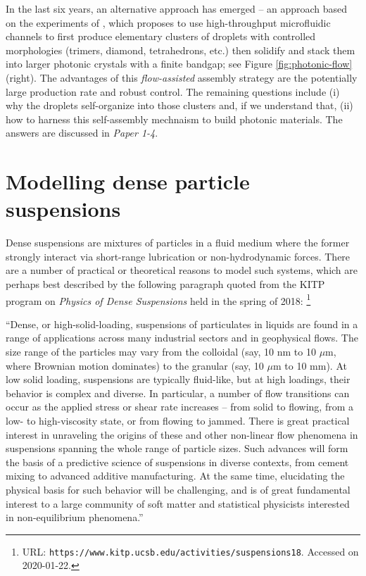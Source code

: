 In the last six years, an alternative approach has emerged -- an approach based on the experiments of \cite{tab0, Shen_AS_2016}, which proposes to use high-throughput microfluidic channels to first produce elementary clusters of droplets with controlled morphologies (trimers, diamond, tetrahedrons, etc.) then solidify and stack them into larger photonic crystals with a finite bandgap; see Figure \ref{fig:photonic-flow} (right).
The advantages of this \emph{flow-assisted} assembly strategy are the potentially large production rate and robust control.
The remaining questions include
(i) why the droplets self-organize into those clusters and, if we understand that,
(ii) how to harness this self-assembly mechnaism to build photonic materials.
The answers are discussed in \emph{Paper 1-4}.


\section{Modelling dense particle suspensions}

Dense suspensions are mixtures of particles in a fluid medium where the former strongly interact via short-range lubrication or non-hydrodynamic forces.
There are a number of practical or theoretical reasons to model such systems, which are perhaps best described by the following paragraph quoted from the KITP program on \emph{Physics of Dense Suspensions} held in the spring of 2018:
\footnote{URL: \texttt{https://www.kitp.ucsb.edu/activities/suspensions18}. Accessed on 2020-01-22.}

\medskip
{\small
``Dense, or high-solid-loading, suspensions of particulates in liquids are found in a range of applications across many industrial sectors and in geophysical flows. The size range of the particles may vary from the colloidal (say, 10 nm to 10 $\mu$m, where Brownian motion dominates) to the granular (say, 10 $\mu$m to 10 mm). At low solid loading, suspensions are typically fluid-like, but at high loadings, their behavior is complex and diverse. In particular, a number of flow transitions can occur as the applied stress or shear rate increases -- from solid to flowing, from a low- to high-viscosity state, or from flowing to jammed. There is great practical interest in unraveling the origins of these and other non-linear flow phenomena in suspensions spanning the whole range of particle sizes. Such advances will form the basis of a predictive science of suspensions in diverse contexts, from cement mixing to advanced additive manufacturing. At the same time, elucidating the physical basis for such behavior will be challenging, and is of great fundamental interest to a large community of soft matter and statistical physicists interested in non-equilibrium phenomena.''}

